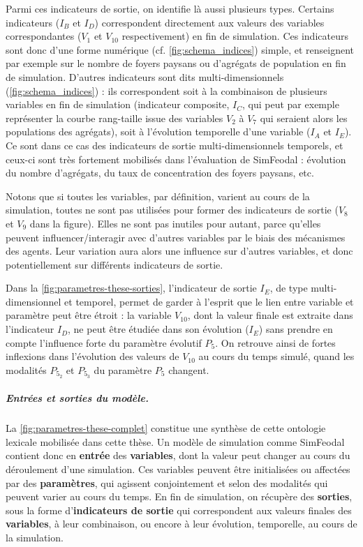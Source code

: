 Parmi ces indicateurs de sortie, on identifie là aussi plusieurs types.
Certains indicateurs ($I_B$ et $I_D$) correspondent directement aux valeurs des variables correspondantes ($V_1$ et $V_{10}$ respectivement) en fin de simulation.
Ces indicateurs sont donc d'une forme numérique (cf. \cref{fig:schema_indices}) simple, et renseignent par exemple sur le nombre de foyers paysans ou d'agrégats de population en fin de simulation.
D'autres indicateurs sont dits \og multi-dimensionnels\fg{} (\cref{fig:schema_indices}) : ils correspondent soit à la combinaison de plusieurs variables en fin de simulation (indicateur \og composite\fg{}, $I_C$, qui peut par exemple représenter la courbe rang-taille issue des variables $V_2$ à $V_7$ qui seraient alors les populations des agrégats), soit à l'évolution temporelle d'une variable ($I_A$ et $I_E$).
Ce sont dans ce cas des indicateurs de sortie multi-dimensionnels temporels, et ceux-ci sont très fortement mobilisés dans l'évaluation de SimFeodal : évolution du nombre d'agrégats, du taux de concentration des foyers paysans, etc.

Notons que si toutes les variables, par définition, varient au cours de la simulation, toutes ne sont pas utilisées pour former des indicateurs de sortie ($V_8$ et $V_9$ dans la figure).
Elles ne sont pas \og inutiles\fg{} pour autant, parce qu'elles peuvent influencer/interagir avec d'autres variables par le biais des mécanismes des agents.
Leur variation aura alors une influence sur d'autres variables, et donc potentiellement sur différents indicateurs de sortie.

Dans la \cref{fig:parametres-these-sorties}, l'indicateur de sortie $I_E$, de type multi-dimensionnel et temporel, permet de garder à l'esprit que le lien entre variable et paramètre peut être étroit : la variable $V_{10}$, dont la valeur finale est extraite dans l'indicateur $I_D$, ne peut être étudiée dans son évolution ($I_E$) sans prendre en compte l'influence forte du paramètre évolutif $P_5$.
On retrouve ainsi de fortes inflexions dans l'évolution des valeurs de $V_{10}$ au cours du temps simulé, quand les modalités $P_{5_2}$ et $P_{5_3}$ du paramètre $P_5$ changent.


\subparagraph{Entrées et sorties du modèle.}
La \cref{fig:parametres-these-complet} constitue une synthèse de cette \og ontologie\fg{} lexicale mobilisée dans cette thèse.
Un modèle de simulation comme SimFeodal contient donc en \textbf{entrée} des \textbf{variables}, dont la valeur peut changer au cours du déroulement d'une simulation.
Ces variables peuvent être initialisées ou affectées par des \textbf{paramètres}, qui agissent conjointement et selon des modalités qui peuvent varier au cours du temps.
En fin de simulation, on récupère des \textbf{sorties}, sous la forme d'\textbf{indicateurs de sortie} qui correspondent aux valeurs finales des \textbf{variables}, à leur combinaison, ou encore à leur évolution, temporelle, au cours de la simulation.

